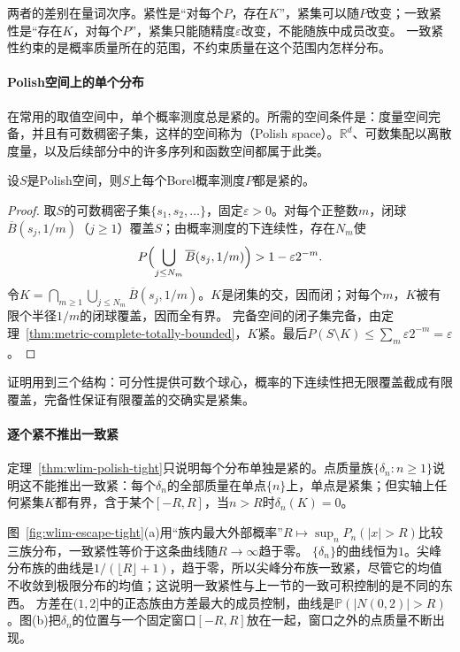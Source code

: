 两者的差别在量词次序。紧性是“对每个$P$，存在$K$”，紧集可以随$P$改变；一致紧性是“存在$K$，对每个$P$”，紧集只能随精度$\varepsilon$改变，不能随族中成员改变。
一致紧性约束的是概率质量所在的范围，不约束质量在这个范围内怎样分布。

\paragraph{Polish空间上的单个分布}
在常用的取值空间中，单个概率测度总是紧的。所需的空间条件是：度量空间完备，并且有可数稠密子集，这样的空间称为（Polish space）。$\mathbb R^d$、可数集配以离散度量，以及后续部分中的许多序列和函数空间都属于此类。

\begin{theorem}[Polish空间上的概率测度是紧的]
\label{thm:wlim-polish-tight}
设$S$是Polish空间，则$S$上每个Borel概率测度$P$都是紧的。
\end{theorem}

\begin{proof}
取$S$的可数稠密子集$\{s_1,s_2,\ldots\}$，固定$\varepsilon>0$。对每个正整数$m$，闭球$\overline B(s_j,1/m)$（$j\geq1$）覆盖$S$；由概率测度的下连续性，存在$N_m$使
\[
  P\Bigl(\bigcup_{j\leq N_m}\overline B(s_j,1/m)\Bigr)>1-\varepsilon2^{-m}.
\]
令$K=\bigcap_{m\geq1}\bigcup_{j\leq N_m}\overline B(s_j,1/m)$。$K$是闭集的交，因而闭；对每个$m$，$K$被有限个半径$1/m$的闭球覆盖，因而全有界。
完备空间的闭子集完备，由定理~\ref{thm:metric-complete-totally-bounded}，$K$紧。最后$P(S\setminus K)\leq\sum_m\varepsilon2^{-m}=\varepsilon$。
\end{proof}

证明用到三个结构：可分性提供可数个球心，概率的下连续性把无限覆盖截成有限覆盖，完备性保证有限覆盖的交确实是紧集。

\paragraph{逐个紧不推出一致紧}
定理~\ref{thm:wlim-polish-tight}只说明每个分布单独是紧的。点质量族$\{\delta_n:n\geq1\}$说明这不能推出一致紧：每个$\delta_n$的全部质量在单点$\{n\}$上，单点是紧集；但实轴上任何紧集$K$都有界，含于某个$[-R,R]$，当$n>R$时$\delta_n(K)=0$。

图~\ref{fig:wlim-escape-tight}(a)用“族内最大外部概率”$R\mapsto\sup_nP_n(|x|>R)$比较三族分布，一致紧性等价于这条曲线随$R\to\infty$趋于零。
$\{\delta_n\}$的曲线恒为$1$。尖峰分布族的曲线是$1/(\lfloor R\rfloor+1)$，趋于零，所以尖峰分布族一致紧，尽管它的均值不收敛到极限分布的均值；这说明一致紧性与上一节的一致可积控制的是不同的东西。
方差在$(1,2]$中的正态族由方差最大的成员控制，曲线是$\mathbb P(|N(0,2)|>R)$。图(b)把$\delta_n$的位置与一个固定窗口$[-R,R]$放在一起，窗口之外的点质量不断出现。

